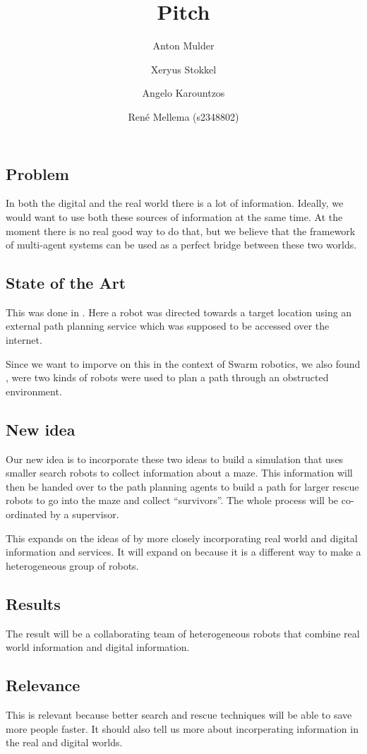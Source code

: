 \documentclass[a4paper,10pt]{article}
\title{Pitch}
\author{Anton Mulder \and Xeryus Stokkel \and Angelo Karountzos \and Ren\'e
    Mellema (s2348802)}
\date{}
\begin{document}
\maketitle

\subsection*{Problem}
In both the digital and the real world there is a lot of information.
Ideally, we would want to use both these sources of information at the same
time. At the moment there is no real good way to do that, but we believe
that the framework of multi-agent systems can be used as a perfect bridge
between these two worlds. 

\subsection*{State of the Art}
This was done in \citet{intframe}. Here a robot was directed towards
a target location using an external path planning service which was
supposed to be accessed over the internet. 

Since we want to imporve on this in the context of Swarm robotics, we also
found \citet{selforg}, were two kinds of robots were used to plan a path
through an obstructed environment. 

\subsection*{New idea}
Our new idea is to incorporate these two ideas to build a simulation that uses
smaller search robots to collect information about a maze. This information will
then be handed over to the path planning agents to build a path for larger
rescue robots to go into the maze and collect ``survivors''. The whole
process will be co-ordinated by a supervisor. 

This expands on the ideas of
\citet{intframe} by more closely incorporating real world and digital
information and services. It will expand on \citet{selforg} because it is a
different way to make a heterogeneous group of robots.

\subsection*{Results}
The result will be a collaborating team of heterogeneous robots that
combine real world information and digital information. 

\subsection*{Relevance}
This is relevant because better search and rescue techniques will be able
to save more people faster. It should also tell us more about incorperating
information in the real and digital worlds. 



\end{document}

